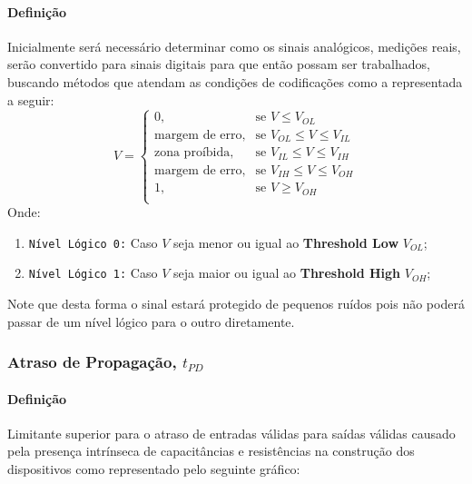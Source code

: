 \documentclass{article}
\begin{document}
                \paragraph{Definição}Inicialmente será necessário determinar como os sinais analógicos, medições reais, serão convertido para sinais digitais para que então possam ser trabalhados, buscando métodos que atendam as condições de codificações como a representada a seguir:
                    \begin{equation}
                        \boxed{
                            V = 
                            \begin{cases}
                                0,                      & \text{se } V \leq V_{OL}\\
                                \text{margem de erro},  & \text{se } V_{OL} \leq V \leq V_{IL}\\
                                \text{zona proíbida},   & \text{se } V_{IL} \leq V \leq V_{IH}\\
                                \text{margem de erro},  & \text{se } V_{IH} \leq V \leq V_{OH}\\
                                1,                      & \text{se } V \geq V_{OH}\\
                            \end{cases}
                        }
                    \end{equation}
                Onde:
                    \begin{enumerate}[noitemsep]
                        \item \texttt{Nível Lógico 0:} Caso $V$ seja menor ou igual ao \textbf{Threshold Low} $V_{OL}$;

                        \item \texttt{Nível Lógico 1:} Caso $V$ seja maior ou igual ao \textbf{Threshold High} $V_{OH}$;
                    \end{enumerate}
                Note que desta forma o sinal estará protegido de pequenos ruídos pois não poderá passar de um nível lógico para o outro diretamente.

        \subsubsection{Atraso de Propagação, $t_{PD}$}
            \paragraph{Definição}Limitante superior para o atraso de entradas válidas para saídas válidas causado pela presença intrínseca de capacitâncias e resistências na construção dos dispositivos como representado pelo seguinte gráfico:
\end{document}
